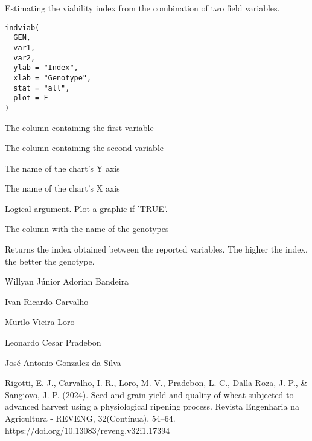 \documentclass[a4paper]{book}
\begin{document}
%
\begin{Description}
Estimating the viability index from the combination of two field variables.
\end{Description}
%
\begin{Usage}
\begin{verbatim}
indviab(
  GEN,
  var1,
  var2,
  ylab = "Index",
  xlab = "Genotype",
  stat = "all",
  plot = F
)
\end{verbatim}
\end{Usage}
%
\begin{Arguments}
\begin{ldescription}
\item[\code{var1}] The column containing the first variable

\item[\code{var2}] The column containing the second variable

\item[\code{ylab}] The name of the chart's Y axis

\item[\code{xlab}] The name of the chart's X axis

\item[\code{plot}] Logical argument. Plot a graphic if 'TRUE'.

\item[\code{genot}] The column with the name of the genotypes
\end{ldescription}
\end{Arguments}
%
\begin{Value}
Returns the index obtained between the reported variables. The higher
the index, the better the genotype.
\end{Value}
%
\begin{Author}
Willyan Júnior Adorian Bandeira

Ivan Ricardo Carvalho

Murilo Vieira Loro

Leonardo Cesar Pradebon

José Antonio Gonzalez da Silva
\end{Author}
%
\begin{References}
Rigotti, E. J., Carvalho, I. R., Loro, M. V., Pradebon, L. C., Dalla Roza,
J. P., \& Sangiovo, J. P. (2024). Seed and grain yield and quality of wheat
subjected to advanced harvest using a physiological ripening process.
Revista Engenharia na Agricultura - REVENG, 32(Contínua), 54–64.
https://doi.org/10.13083/reveng.v32i1.17394
\end{References}
\end{document}

